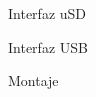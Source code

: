 \begin{frame}{Interfaz uSD} %

\end{frame}

\begin{frame}{Interfaz USB} %

\end{frame}

\begin{frame}{Montaje} %

\end{frame}